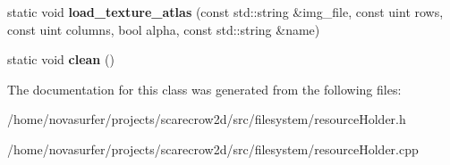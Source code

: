 \begin{DoxyCompactItemize}
\item 
\mbox{\label{classsc2d_1_1ResourceHolder_a6d6cea634ac3849645703e8162067ed4}} 
static void {\bfseries load\+\_\+texture\+\_\+atlas} (const std\+::string \&img\+\_\+file, const uint rows, const uint columns, bool alpha, const std\+::string \&name)
\item 
\mbox{\label{classsc2d_1_1ResourceHolder_a4893cc969c61ab4f0664cad5859f4c69}} 
static void {\bfseries clean} ()
\end{DoxyCompactItemize}


The documentation for this class was generated from the following files\+:\begin{DoxyCompactItemize}
\item 
/home/novasurfer/projects/scarecrow2d/src/filesystem/resource\+Holder.\+h\item 
/home/novasurfer/projects/scarecrow2d/src/filesystem/resource\+Holder.\+cpp\end{DoxyCompactItemize}

